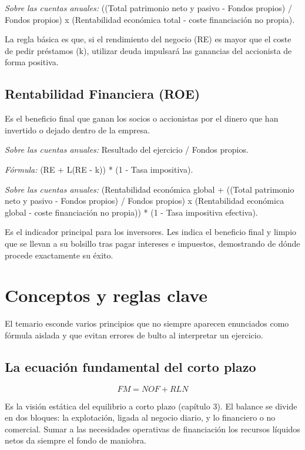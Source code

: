 \documentclass[12pt]{book} %
\begin{document}
\emph{Sobre las cuentas anuales:} ((Total patrimonio neto y pasivo -
Fondos propios) / Fondos propios) x (Rentabilidad económica total -
coste financiación no propia).

La regla básica es que, si el rendimiento del negocio (RE) es mayor que
el coste de pedir préstamos (k), utilizar deuda impulsará las ganancias
del accionista de forma positiva.

\hypertarget{rentabilidad-financiera-roe}{%
\subsection{Rentabilidad Financiera
(ROE)}\label{rentabilidad-financiera-roe}}

Es el beneficio final que ganan los socios o accionistas por el dinero
que han invertido o dejado dentro de la empresa.

\emph{Sobre las cuentas anuales:} Resultado del ejercicio / Fondos
propios.

\emph{Fórmula:} (RE + L(RE - k)) * (1 - Tasa impositiva).

\emph{Sobre las cuentas anuales:} (Rentabilidad económica global +
((Total patrimonio neto y pasivo - Fondos propios) / Fondos propios) x
(Rentabilidad económica global - coste financiación no propia)) * (1 -
Tasa impositiva efectiva).

Es el indicador principal para los inversores. Les indica el beneficio
final y limpio que se llevan a su bolsillo tras pagar intereses e
impuestos, demostrando de dónde procede exactamente su éxito.

\hypertarget{conceptos-y-reglas-clave}{%
\section{Conceptos y reglas clave}\label{conceptos-y-reglas-clave}}

El temario esconde varios principios que no siempre aparecen enunciados
como fórmula aislada y que evitan errores de bulto al interpretar un
ejercicio.

\hypertarget{la-ecuaciuxf3n-fundamental-del-corto-plazo}{%
\subsection{La ecuación fundamental del corto
plazo}\label{la-ecuaciuxf3n-fundamental-del-corto-plazo}}

\[FM = NOF + RLN\]

Es la visión estática del equilibrio a corto plazo (capítulo 3). El
balance se divide en dos bloques: la explotación, ligada al negocio
diario, y lo financiero o no comercial. Sumar a las necesidades
operativas de financiación los recursos líquidos netos da siempre el
fondo de maniobra.
\end{document}
